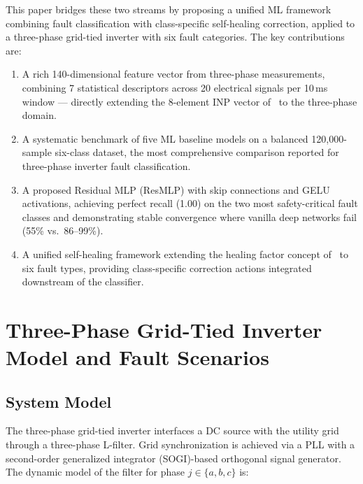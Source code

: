 \documentclass[conference]{IEEEtran}
\begin{document}
This paper bridges these two streams by proposing a unified ML framework
combining fault classification with class-specific self-healing correction,
applied to a three-phase grid-tied inverter with six fault categories. The
key contributions are:

\begin{enumerate}
  \item A rich 140-dimensional feature vector from three-phase measurements,
        combining 7 statistical descriptors across 20 electrical signals per
        10\,ms window --- directly extending the 8-element INP vector
        of~\cite{baker2021} to the three-phase domain.

  \item A systematic benchmark of five ML baseline models on a balanced
        120,000-sample six-class dataset, the most comprehensive comparison
        reported for three-phase inverter fault classification.

  \item A proposed Residual MLP (ResMLP) with skip connections and GELU
        activations, achieving perfect recall (1.00) on the two most
        safety-critical fault classes and demonstrating stable convergence
        where vanilla deep networks fail (55\% vs.\ 86--99\%).

  \item A unified self-healing framework extending the healing factor concept
        of~\cite{baker2021} to six fault types, providing class-specific
        correction actions integrated downstream of the classifier.
\end{enumerate}

\section{Three-Phase Grid-Tied Inverter Model and Fault Scenarios}

\subsection{System Model}

The three-phase grid-tied inverter interfaces a DC source with the utility
grid through a three-phase L-filter. Grid synchronization is achieved via a
PLL with a second-order generalized integrator (SOGI)-based orthogonal signal
generator. The dynamic model of the filter for phase
$j \in \{a, b, c\}$ is:
\end{document}
